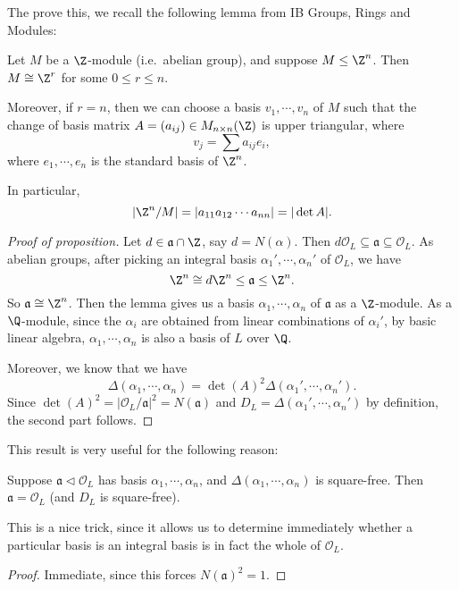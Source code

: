 \documentclass[a4paper]{article}
\begin{document}
The prove this, we recall the following lemma from IB Groups, Rings and Modules:
\begin{lemma}
  Let $M$ be a $\Z$-module (i.e.\ abelian group), and suppose $M \leq \Z^n$. Then $M \cong \Z^r$ for some $0 \leq r \leq n$.

  Moreover, if $r = n$, then we can choose a basis $v_1, \cdots, v_n$ of $M$ such that the change of basis matrix $A = (a_{ij}) \in M_{n \times n}(\Z)$ is upper triangular, where
  \[
    v_j = \sum a_{ij} e_i,
  \]
  where $e_1, \cdots, e_n$ is the standard basis of $\Z^n$.

  In particular,
  \[
    |\Z^n/M| = |a_{11} a_{12} \cdots a_{nn}| = |\det A|.
  \]
\end{lemma}

\begin{proof}[Proof of proposition]
  Let $d \in \mathfrak{a} \cap \Z$, say $d = N(\alpha)$. Then $d \mathcal{O}_L \subseteq \mathfrak{a} \subseteq \mathcal{O}_L$. As abelian groups, after picking an integral basis $\alpha_1', \cdots, \alpha_n'$ of $\mathcal{O}_L$, we have
  \[
    \Z^n \cong d \Z^n \leq \mathfrak{a} \leq \Z^n.
  \]
  So $\mathfrak{a} \cong \Z^n$. Then the lemma gives us a basis $\alpha_1, \cdots, \alpha_n$ of $\mathfrak{a}$ as a $\Z$-module. As a $\Q$-module, since the $\alpha_i$ are obtained from linear combinations of $\alpha_i'$, by basic linear algebra, $\alpha_1, \cdots, \alpha_n$ is also a basis of $L$ over $\Q$.

  Moreover, we know that we have
  \[
    \Delta(\alpha_1, \cdots, \alpha_n) = \det(A)^2 \Delta(\alpha_1', \cdots, \alpha_n').
  \]
  Since $\det(A)^2 = |\mathcal{O}_L/\mathfrak{a}|^2 = N(\mathfrak{a})$ and $D_L = \Delta(\alpha_1', \cdots, \alpha_n')$ by definition, the second part follows.
\end{proof}

This result is very useful for the following reason:
\begin{cor}
  Suppose $\mathfrak{a} \lhd \mathcal{O}_L$ has basis $\alpha_1, \cdots, \alpha_n$, and $\Delta(\alpha_1, \cdots, \alpha_n)$ is square-free. Then $\mathfrak{a} = \mathcal{O}_L$ (and $D_L$ is square-free).
\end{cor}
This is a nice trick, since it allows us to determine immediately whether a particular basis is an integral basis is in fact the whole of $\mathcal{O}_L$.

\begin{proof}
  Immediate, since this forces $N(\mathfrak{a})^2 = 1$.
\end{proof}
\end{document}
